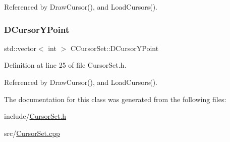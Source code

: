 Referenced by Draw\+Cursor(), and Load\+Cursors().

\hypertarget{classCCursorSet_a581192f0e4414acce8b1da7f24ea1b98}{}\label{classCCursorSet_a581192f0e4414acce8b1da7f24ea1b98} 
\subsubsection{\texorpdfstring{D\+Cursor\+Y\+Point}{DCursorYPoint}}
{\footnotesize\ttfamily std\+::vector$<$ int $>$ C\+Cursor\+Set\+::\+D\+Cursor\+Y\+Point\hspace{0.3cm}{\ttfamily [protected]}}



Definition at line 25 of file Cursor\+Set.\+h.



Referenced by Draw\+Cursor(), and Load\+Cursors().



The documentation for this class was generated from the following files\+:\begin{DoxyCompactItemize}
\item 
include/\hyperlink{CursorSet_8h}{Cursor\+Set.\+h}\item 
src/\hyperlink{CursorSet_8cpp}{Cursor\+Set.\+cpp}\end{DoxyCompactItemize}
